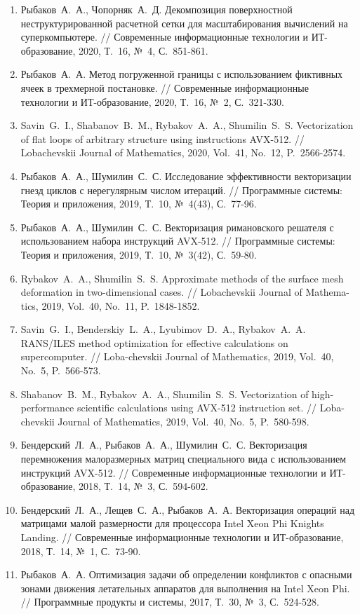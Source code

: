 \documentclass[a4paper,14pt]{extarticle}                     %
\theoremstyle{plain}                                         %
\begin{document}
\begin{enumerate}[noitemsep,topsep=0pt,parsep=0pt,partopsep=0pt]
\item Рыбаков~А.~А., Чопорняк~А.~Д. Декомпозиция поверхностной неструктурированной расчетной сетки для масштабирования вычислений на суперкомпьютере. // Современные информационные технологии и ИТ-образование, 2020, Т.~16, №~4, С.~851-861.
\item Рыбаков~А.~А. Метод погруженной границы с использованием фиктивных ячеек в трехмерной постановке. // Современные информационные технологии и ИТ-образование, 2020, Т.~16, №~2, С.~321-330.
\item Savin~G.~I., Shabanov~B.~M., Rybakov~A.~A., Shumilin~S.~S. Vectorization of flat loops of arbitrary structure using instructions AVX-512. // Lobachevskii Journal of Mathematics, 2020, Vol.~41, No.~12, P.~2566-2574.
\item Рыбаков~А.~А., Шумилин~С.~С. Исследование эффективности векторизации гнезд циклов с нерегулярным числом итераций. // Программные системы: Теория и приложения, 2019, Т.~10, №~4(43), С.~77-96.
\item Рыбаков~А.~А., Шумилин~С.~С. Векторизация римановского решателя с использованием набора инструкций AVX-512. // Программные системы: Теория и приложения, 2019, Т.~10, №~3(42), С.~59-80.
\item Rybakov~A.~A., Shumilin~S.~S. Approximate methods of the surface mesh deformation in two-dimensional cases. // Lobachevskii Journal of Mathema-tics, 2019, Vol.~40, No.~11, P.~1848-1852.
\item Savin~G.~I., Benderskiy~L.~A., Lyubimov~D.~A., Rybakov~A.~A. RANS/ILES method optimization for effective calculations on supercomputer. // Loba-chevskii Journal of Mathematics, 2019, Vol.~40, No.~5, P.~566-573.
\item Shabanov~B.~M., Rybakov~A.~A., Shumilin~S.~S. Vectorization of high-performance scientific calculations using AVX-512 instruction set. // Loba-chevskii Journal of Mathematics, 2019, Vol.~40, No.~5, P.~580-598.
\item Бендерский~Л.~А., Рыбаков~А.~А., Шумилин~С.~С. Векторизация перемножения малоразмерных матриц специального вида с использованием инструкций AVX-512. // Современные информационные технологии и ИТ-образование, 2018, Т.~14, №~3, С.~594-602.
\item Бендерский~Л.~А., Лещев~С.~А., Рыбаков~А.~А. Векторизация операций над матрицами малой размерности для процессора Intel Xeon Phi Knights Landing. // Современные информационные технологии и ИТ-образование, 2018, Т.~14, №~1, С.~73-90.
\item Рыбаков~А.~А. Оптимизация задачи об определении конфликтов с опасными зонами движения летательных аппаратов для выполнения на Intel Xeon Phi. // Программные продукты и системы, 2017, Т.~30, №~3, С.~524-528.

\end{enumerate}
\end{document}
